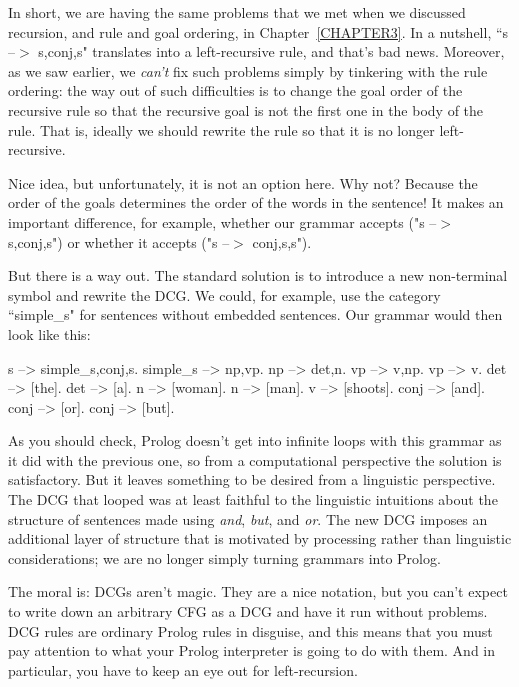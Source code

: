 In short, we are having the same problems that we met when we
discussed recursion, and rule and goal ordering, in
Chapter~\ref{CHAPTER3}.  In a nutshell, ``s --$>$ s,conj,s" translates
into a left-recursive rule, and that's bad news.  Moreover, as we saw
earlier, we \textit{can't} fix such problems simply by tinkering with
the rule ordering: the way out of such difficulties is to change the
goal order of the recursive rule so that the recursive goal is not the
first one in the body of the rule. That is, ideally we should rewrite
the rule so that it is no longer left-recursive.

Nice idea, but unfortunately, it is not an option here.  Why not?
Because the order of the goals determines the order of the words in
the sentence!  It makes an important difference, for example, whether
our grammar accepts  ("s --$>$ s,conj,s") or whether it accepts
 ("s --$>$ conj,s,s").

But there is a way out.
The standard solution is to introduce a new non-terminal symbol and
rewrite the DCG.  We could, for example, use the category ``simple\_s"
for sentences without embedded sentences. Our grammar would then look
like this:
\begin{LPNcodedisplay}
s --> simple_s,conj,s.
simple_s --> np,vp.
np --> det,n.
vp --> v,np.
vp --> v.
det --> [the].
det --> [a].
n --> [woman].
n --> [man].
v --> [shoots].
conj --> [and].
conj --> [or].
conj --> [but].
\end{LPNcodedisplay}

As you should check, Prolog doesn't get into infinite loops with this
grammar as it did with the previous one, so from a computational
perspective the solution is satisfactory. But it leaves something to
be desired from a linguistic perspective. The DCG that looped was at
least faithful to the linguistic intuitions about the structure of
sentences made using \textit{and}, \textit{but}, and \textit{or}.  The
new DCG imposes an additional layer of structure that is motivated by
processing rather than linguistic considerations; we are no longer
simply turning grammars into Prolog.

The moral is: DCGs aren't magic. They are a nice notation, but you
can't expect to write down an arbitrary CFG as a DCG and have it run
without problems. DCG rules are ordinary Prolog rules in disguise, and
this means that you must pay attention to what your Prolog interpreter
is going to do with them. And in particular, you have to keep an eye
out for left-recursion.


